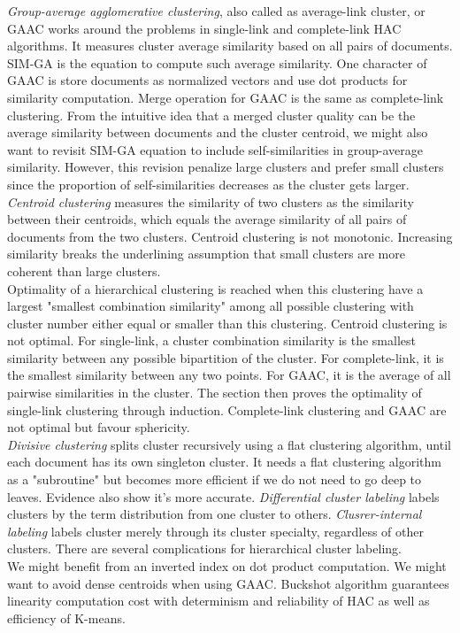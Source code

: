 \documentclass{sig-alternate-05-2015}
\begin{document}
\textit{Group-average agglomerative clustering}, also called as average-link cluster, or GAAC works around the problems in single-link and complete-link HAC algorithms. It measures cluster average similarity based on all pairs of documents. SIM-GA is the equation to compute such average similarity. One character of GAAC is store documents as normalized vectors and use dot products for similarity computation. Merge operation for GAAC is the same as complete-link clustering. From the intuitive idea that a merged cluster quality can be the average similarity between documents and the cluster centroid, we might also want to revisit SIM-GA equation to include self-similarities in group-average similarity. However, this revision penalize large clusters and prefer small clusters since the proportion of self-similarities decreases as the cluster gets larger.  \\
\textit{Centroid clustering} measures the similarity of two clusters as the similarity between their centroids, which equals the average similarity of all pairs of documents from the two clusters. Centroid clustering is not monotonic. Increasing similarity breaks the underlining assumption that small clusters are more coherent than large clusters. \\
Optimality of a hierarchical clustering is reached when this clustering have a largest "smallest combination similarity" among all possible clustering with cluster number either equal or smaller than this clustering. Centroid clustering is not optimal. For single-link, a cluster combination similarity is the smallest similarity between any possible bipartition of the cluster. For complete-link, it is the smallest similarity between any two points. For GAAC, it is the average of all pairwise similarities in the cluster. The section then proves the optimality of single-link clustering through induction.  
Complete-link clustering and GAAC are not optimal but favour sphericity. \\
\textit{Divisive clustering} splits cluster recursively using a flat clustering algorithm, until each document has its own singleton cluster. It needs a flat clustering algorithm as a "subroutine" but becomes more efficient if we do not need to go deep to leaves. Evidence also show it's more accurate. \textit{Differential cluster labeling} labels clusters by the term distribution from one cluster to others. \textit{Clusrer-internal labeling} labels cluster merely through its cluster specialty, regardless of other clusters. There are several complications for hierarchical cluster labeling. \\
We might benefit from an inverted index on dot product computation. We might want to avoid dense centroids when using GAAC. Buckshot algorithm guarantees linearity computation cost with determinism and reliability of HAC as well as efficiency of K-means.







\end{document}
